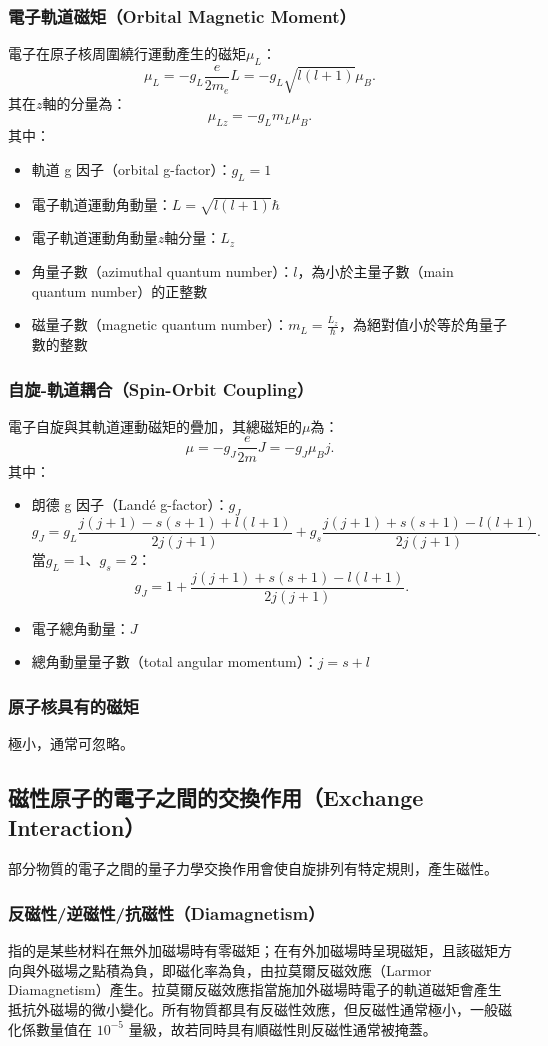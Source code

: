 \documentclass[a4paper,12pt]{report}
\begin{document}
\begin{itemize}
\subsubsection{電子軌道磁矩（Orbital Magnetic Moment）}
電子在原子核周圍繞行運動產生的磁矩$\mu_L$：
\[\mu_L=-g_L\frac{e}{2m_e}L=-g_L\sqrt{l(l+1)}\mu_B.\]
其在$z$軸的分量為：
\[\mu_{Lz}=-g_Lm_L\mu_B.\]
其中：
\begin{itemize}
\item 軌道 g 因子（orbital g-factor）：$g_L=1$
\item 電子軌道運動角動量：$L=\sqrt{l(l+1)}\hbar$
\item 電子軌道運動角動量$z$軸分量：$L_z$
\item 角量子數（azimuthal quantum number）：$l$，為小於主量子數（main quantum number）的正整數
\item 磁量子數（magnetic quantum number）：$m_L=\frac{L_z}{\hbar}$，為絕對值小於等於角量子數的整數
\end{itemize}
\subsubsection{自旋-軌道耦合（Spin-Orbit Coupling）}
電子自旋與其軌道運動磁矩的疊加，其總磁矩的$\mu$為：
\[\mu=-g_J\frac{e}{2m}J=-g_J\mu_Bj.\]
其中：
\begin{itemize}
\item 朗德 g 因子（Landé g-factor）：$g_J$
\[g_J=g_L\frac{j(j+1)-s(s+1)+l(l+1)}{2j(j+1)}+g_s\frac{j(j+1)+s(s+1)-l(l+1)}{2j(j+1)}.\]
當$g_L=1$、$g_s=2$：
\[g_J=1+\frac{j(j+1)+s(s+1)-l(l+1)}{2j(j+1)}.\]
\item 電子總角動量：$J$
\item 總角動量量子數（total angular momentum）：$j=s+l$
\end{itemize}
\subsubsection{原子核具有的磁矩}
極小，通常可忽略。
\subsection{磁性原子的電子之間的交換作用（Exchange Interaction）}
部分物質的電子之間的量子力學交換作用會使自旋排列有特定規則，產生磁性。
\subsubsection{反磁性/逆磁性/抗磁性（Diamagnetism）}
指的是某些材料在無外加磁場時有零磁矩；在有外加磁場時呈現磁矩，且該磁矩方向與外磁場之點積為負，即磁化率為負，由拉莫爾反磁效應（Larmor Diamagnetism）產生。拉莫爾反磁效應指當施加外磁場時電子的軌道磁矩會產生抵抗外磁場的微小變化。所有物質都具有反磁性效應，但反磁性通常極小，一般磁化係數量值在 $10^{-5}$ 量級，故若同時具有順磁性則反磁性通常被掩蓋。

\end{itemize}
\end{document}
